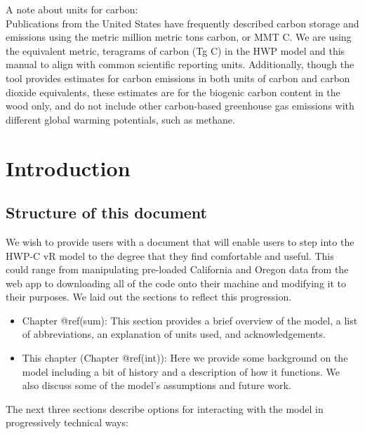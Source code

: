 \documentclass[
  openany]{book}
\providecommand{\tightlist}{%
  \setlength{\itemsep}{0pt}\setlength{\parskip}{0pt}}
\begin{document}
A note about units for carbon:\\
Publications from the United States have frequently described carbon
storage and emissions using the metric million metric tons carbon, or
MMT C. We are using the equivalent metric, teragrams of carbon (Tg C) in
the HWP model and this manual to align with common scientific reporting
units. Additionally, though the tool provides estimates for carbon
emissions in both units of carbon and carbon dioxide equivalents, these
estimates are for the biogenic carbon content in the wood only, and do
not include other carbon-based greenhouse gas emissions with different
global warming potentials, such as methane.

\hypertarget{int}{%
\chapter{Introduction}\label{int}}

\hypertarget{int-struc}{%
\section{Structure of this document}\label{int-struc}}

We wish to provide users with a document that will enable users to step
into the HWP-C vR model to the degree that they find comfortable and
useful. This could range from manipulating pre-loaded California and
Oregon data from the web app to downloading all of the code onto their
machine and modifying it to their purposes. We laid out the sections to
reflect this progression.

\begin{itemize}
\tightlist
\item
  Chapter @ref(sum): This section provides a brief overview of the
  model, a list of abbreviations, an explanation of units used, and
  acknowledgements.\\
\item
  This chapter (Chapter @ref(int)): Here we provide some background on
  the model including a bit of history and a description of how it
  functions. We also discuss some of the model's assumptions and future
  work.
\end{itemize}

The next three sections describe options for interacting with the model
in progressively technical ways:
\end{document}
